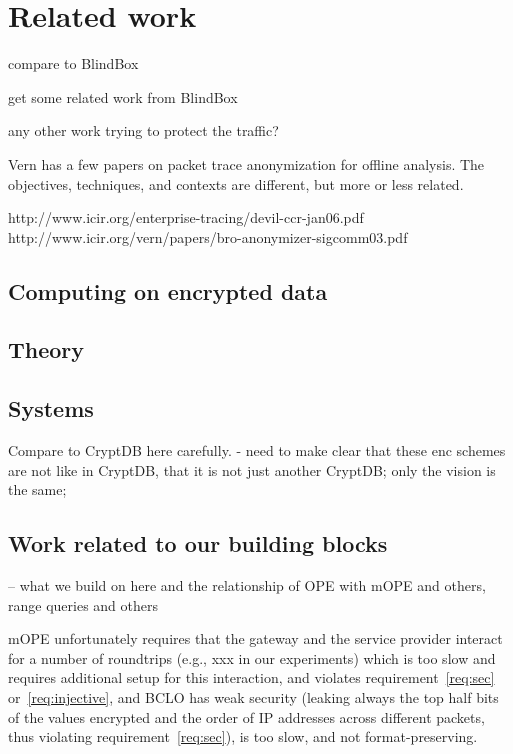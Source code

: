 
\section{Related work}\label{sec:related}

compare to BlindBox

get some related work from BlindBox

any other work trying to protect the traffic? 

Vern has a few papers on packet trace anonymization for offline analysis. The objectives, techniques, and contexts are different, but more or less related.

http://www.icir.org/enterprise-tracing/devil-ccr-jan06.pdf
http://www.icir.org/vern/papers/bro-anonymizer-sigcomm03.pdf



\subsection{Computing on encrypted data}

\subsection{Theory}


\subsection{Systems}

Compare to CryptDB here carefully. 
- need to make clear that these enc schemes are not like in CryptDB, that it is not just another CryptDB; only the vision is the same; %


\subsection{Work related to our building blocks}

-- what we build on here and the relationship of OPE with mOPE and others, range queries and others


 mOPE unfortunately requires that the gateway and the service provider interact for a number of roundtrips (e.g., xxx in our experiments) which is too slow and requires additional setup for this interaction, and violates requirement~\ref{req:sec} or~\ref{req:injective}, and BCLO has weak security (leaking always the top half bits of the values encrypted and the order of IP addresses across different packets, thus violating requirement~\ref{req:sec}), is too slow, and not format-preserving. 


